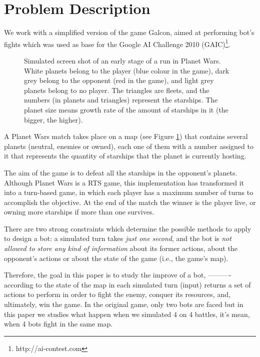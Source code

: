 \documentclass{llncs}
\begin{document}
\section{Problem Description}
\label{sec:problemDescription}

We work with a simplified version of the game Galcon, aimed at performing bot's fights which was used as base for the Google AI Challenge 2010 (GAIC)\footnote{http://ai-contest.com}.

\begin{figure}[ht]
\tiny
\begin{center}
\end{center}
\caption{Simulated screen shot of an early stage of a run in Planet Wars. White planets belong to the player (blue colour in the game), dark grey belong to the opponent (red in the game), and light grey planets belong to no player. The triangles are fleets, and the numbers (in planets and triangles) represent the starships. The planet size means growth rate of the amount of starships in it (the bigger, the higher).}
\label{figura:PlanetWars1}
\end{figure}

A Planet Wars match takes place on a map (see Figure \ref{figura:PlanetWars1}) that contains several planets (neutral, enemies or owned), each one of them with a number assigned to it that represents the quantity of starships that the planet is currently hosting. 

The aim of the game is to defeat all the starships in the opponent's planets. Although Planet Wars is a RTS game, this implementation has transformed it into a turn-based game, in which each player has a maximum number of turns to accomplish the objective. At the end of the match the winner is the player live, or owning more starships if more than one survives. 

There are two strong constraints which determine the possible methods to apply to design
a bot: a simulated turn takes \textit{just one second}, and the bot is \textit{not allowed to store any kind of information} about its former actions, about the opponent's actions or about the state of the game (i.e., the game's map).

Therefore, the goal in this paper is to study the improve of a bot, ---------- according to the state of the map in each simulated turn (input) returns a set of actions to perform in order to fight the enemy, conquer its resources, and, ultimately, win the game. In the original game, only two bots are faced but in this paper we studies what happen when we simulated 4 on 4 battles, it's mean, when 4 bots fight in the same map.
\end{document}
